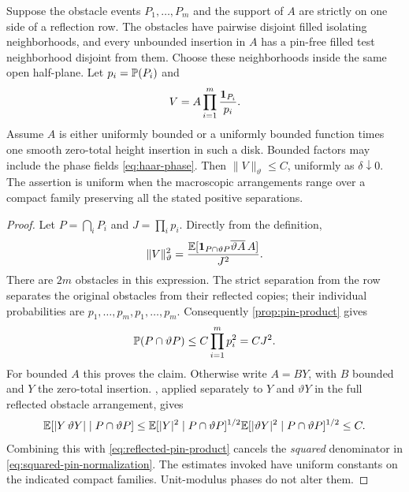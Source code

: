 \begin{lemma}\label{lem:normalized-reflection}
Suppose the obstacle events $P_1,\ldots,P_m$ and the support of $A$
are strictly on one side of a reflection row.  The obstacles have
pairwise disjoint filled isolating neighborhoods, and every unbounded
insertion in $A$ has a pin-free filled test neighborhood disjoint from
them.  Choose these neighborhoods inside the same open half-plane.  Let
$p_i=\mathbb P(P_i)$ and
\[
 V=A\prod_{i=1}^m\frac{\mathbf 1_{P_i}}{p_i}.
\]
Assume $A$ is either uniformly bounded or a uniformly bounded
function times one smooth zero-total height insertion in such a
disk.  Bounded factors may include the phase fields
\eqref{eq:haar-phase}.  Then $\|V\|_{\vartheta}\le C$, uniformly
as $\delta\downarrow0$.  The assertion is uniform when the
macroscopic arrangements range over a compact family preserving
all the stated positive separations.
\end{lemma}

\begin{proof}
Let $P=\bigcap_iP_i$ and $J=\prod_i p_i$.  Directly from the
definition,
\begin{equation}\label{eq:squared-pin-normalization}
 \|V\|_{\vartheta}^{2}
 =\frac{\mathbb E[\mathbf 1_{P\cap\vartheta P}
                    \overline{\vartheta A}\,A]}{J^2}.
\end{equation}
There are $2m$ obstacles in this expression.  The strict separation
from the row separates the original obstacles from their reflected
copies; their individual probabilities are
$p_1,\ldots,p_m,p_1,\ldots,p_m$.  Consequently
\cref{prop:pin-product} gives
\begin{equation}\label{eq:reflected-pin-product}
 \mathbb P(P\cap\vartheta P)\le C\prod_{i=1}^m p_i^2=CJ^2.
\end{equation}
For bounded $A$ this proves the claim.  Otherwise write $A=BY$,
with $B$ bounded and $Y$ the zero-total insertion.
, applied separately to $Y$ and
$\vartheta Y$ in the full reflected obstacle arrangement, gives
\[
 \mathbb E[|Y\,\vartheta Y|\mid P\cap\vartheta P]
 \le\mathbb E[|Y|^2\mid P\cap\vartheta P]^{1/2}
      \mathbb E[|\vartheta Y|^2\mid P\cap\vartheta P]^{1/2}\le C.
\]
Combining this with \eqref{eq:reflected-pin-product} cancels the
\emph{squared} denominator in \eqref{eq:squared-pin-normalization}.
The estimates invoked have uniform constants on the indicated
compact families.  Unit-modulus phases do not alter them.
\end{proof}


